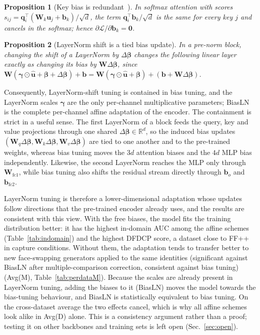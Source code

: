 \documentclass[fonts]{icst}
\newtheorem{proposition}{Proposition}
\begin{document}
\begin{proposition}[Key bias is redundant~\cite{namazifar2023bias}]
\label{prop:key}
In softmax attention with scores $s_{ij}=\mathbf{q}_i^\top(\mathbf{W}_k\mathbf{u}_j+\mathbf{b}_k)/\sqrt{d}$, the term $\mathbf{q}_i^\top\mathbf{b}_k/\sqrt{d}$ is the same for every key $j$ and cancels in the softmax; hence $\partial\mathcal{L}/\partial\mathbf{b}_k=\mathbf{0}$.
\end{proposition}

\begin{proposition}[LayerNorm shift is a tied bias update]
\label{prop:fold}
In a pre-norm block, changing the shift of a LayerNorm by $\Delta\boldsymbol{\beta}$ changes the following linear layer exactly as changing its bias by $\mathbf{W}\Delta\boldsymbol{\beta}$, since $\mathbf{W}(\boldsymbol{\gamma}\odot\hat{\mathbf{u}}+\boldsymbol{\beta}+\Delta\boldsymbol{\beta})+\mathbf{b}=\mathbf{W}(\boldsymbol{\gamma}\odot\hat{\mathbf{u}}+\boldsymbol{\beta})+(\mathbf{b}+\mathbf{W}\Delta\boldsymbol{\beta})$.
\end{proposition}

Consequently, LayerNorm-shift tuning is contained in bias tuning, and the LayerNorm scales $\boldsymbol{\gamma}$ are the only per-channel multiplicative parameters; BiasLN is the complete per-channel affine adaptation of the encoder. The containment is strict in a useful sense. The first LayerNorm of a block feeds the query, key and value projections through one shared $\Delta\boldsymbol{\beta}\in\mathbb{R}^{d}$, so the induced bias updates $(\mathbf{W}_q\Delta\boldsymbol{\beta},\mathbf{W}_k\Delta\boldsymbol{\beta},\mathbf{W}_v\Delta\boldsymbol{\beta})$ are tied to one another and to the pre-trained weights, whereas bias tuning moves the $3d$ attention biases and the $4d$ MLP bias independently. Likewise, the second LayerNorm reaches the MLP only through $\mathbf{W}_{\mathrm{fc1}}$, while bias tuning also shifts the residual stream directly through $\mathbf{b}_o$ and $\mathbf{b}_{\mathrm{fc2}}$.

LayerNorm tuning is therefore a lower-dimensional adaptation whose updates follow directions that the pre-trained encoder already uses, and the results are consistent with this view. With the free biases, the model fits the training distribution better: it has the highest in-domain AUC among the affine schemes (Table~\ref{tab:indomain}) and the highest DFDCP score, a dataset close to FF++ in capture conditions. Without them, the adaptation tends to transfer better to new face-swapping generators applied to the same identities (significant against BiasLN after multiple-comparison correction, consistent against bias tuning) (Avg(M), Table~\ref{tab:perdataM}). Because the scales are already present in LayerNorm tuning, adding the biases to it (BiasLN) moves the model towards the bias-tuning behaviour, and BiasLN is statistically equivalent to bias tuning. On the cross-dataset average the two effects cancel, which is why all affine schemes look alike in Avg(D) alone. This is a consistency argument rather than a proof; testing it on other backbones and training sets is left open (Sec.~\ref{sec:open}).
\end{document}
